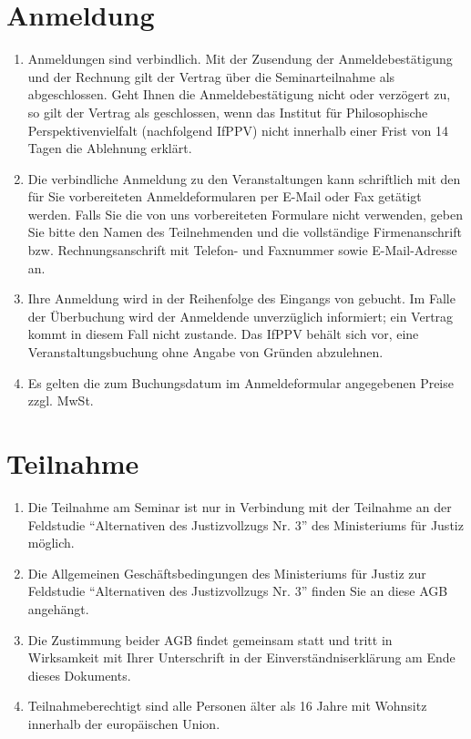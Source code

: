 \documentclass[a4paper, 12pt]{scrartcl}
\begin{document}
    \section{Anmeldung}
    \begin{enumerate}
        \item Anmeldungen sind verbindlich.
        Mit der Zusendung der Anmeldebestätigung und der Rechnung gilt der Vertrag über die Seminarteilnahme als abgeschlossen.
        Geht Ihnen die Anmeldebestätigung nicht oder verzögert zu, so gilt der Vertrag als geschlossen, wenn das Institut f\"ur Philosophische Perspektivenvielfalt (nachfolgend IfPPV) nicht innerhalb einer Frist von 14 Tagen die Ablehnung erklärt.

        \item Die verbindliche Anmeldung zu den Veranstaltungen kann schriftlich mit den für Sie vorbereiteten Anmeldeformularen per E-Mail oder Fax getätigt werden.
        Falls Sie die von uns vorbereiteten Formulare nicht verwenden, geben Sie bitte den Namen des Teilnehmenden und die vollständige Firmenanschrift bzw. Rechnungsanschrift mit Telefon- und Faxnummer sowie E-Mail-Adresse an.

        \item Ihre Anmeldung wird in der Reihenfolge des Eingangs von gebucht.
        Im Falle der Überbuchung wird der Anmeldende unverzüglich informiert; ein Vertrag kommt in diesem Fall nicht zustande.
        Das IfPPV beh\"alt sich vor, eine Veranstaltungsbuchung ohne Angabe von Gr\"unden abzulehnen.

        \item Es gelten die zum Buchungsdatum im Anmeldeformular angegebenen Preise zzgl. MwSt.
    \end{enumerate}

    \section{Teilnahme}
    \begin{enumerate}
        \item Die Teilnahme am Seminar ist nur in Verbindung mit der Teilnahme an der Feldstudie \enquote{Alternativen des Justizvollzugs Nr. 3} des Ministeriums f\"ur Justiz m\"oglich.
        
        \item Die Allgemeinen Gesch\"aftsbedingungen des Ministeriums f\"ur Justiz zur Feldstudie \enquote{Alternativen des Justizvollzugs Nr. 3} finden Sie an diese AGB angeh\"angt.
        
        \item Die Zustimmung beider AGB findet gemeinsam statt und tritt in Wirksamkeit mit Ihrer Unterschrift in der Einverst\"andniserkl\"arung am Ende dieses Dokuments.

	\item Teilnahmeberechtigt sind alle Personen \"alter als 16 Jahre mit Wohnsitz innerhalb der europ\"aischen Union.
    \end{enumerate}
\end{document}
